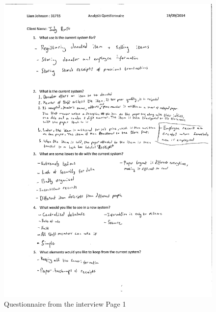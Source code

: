 \begin{figure}[H]
    \includegraphics[width=\textwidth]{Appendix1.pdf}
    \caption{Questionnaire from the interview Page 1} \label{fig:SectionAppendix}
\end{figure}


